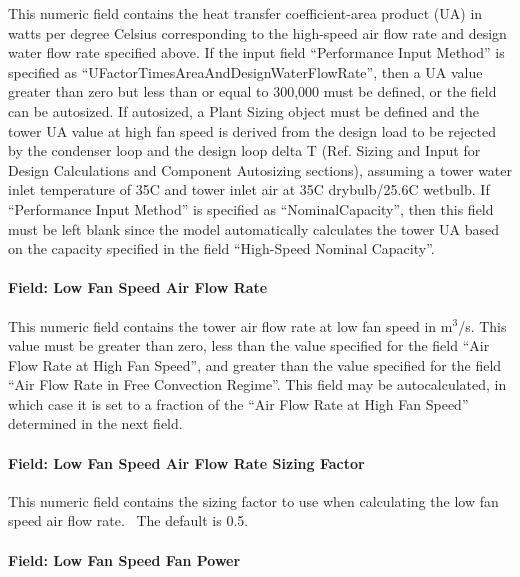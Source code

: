 This numeric field contains the heat transfer coefficient-area product (UA) in watts per degree Celsius corresponding to the high-speed air flow rate and design water flow rate specified above. If the input field ``Performance Input Method'' is specified as ``UFactorTimesAreaAndDesignWaterFlowRate'', then a UA value greater than zero but less than or equal to 300,000 must be defined, or the field can be autosized. If autosized, a Plant Sizing object must be defined and the tower UA value at high fan speed is derived from the design load to be rejected by the condenser loop and the design loop delta T (Ref. Sizing and Input for Design Calculations and Component Autosizing sections), assuming a tower water inlet temperature of 35C and tower inlet air at 35C drybulb/25.6C wetbulb. If ``Performance Input Method'' is specified as ``NominalCapacity'', then this field must be left blank since the model automatically calculates the tower UA based on the capacity specified in the field ``High-Speed Nominal Capacity''.

\paragraph{Field: Low Fan Speed Air Flow Rate}\label{field-low-fan-speed-air-flow-rate}

This numeric field contains the tower air flow rate at low fan speed in m\(^{3}\)/s. This value must be greater than zero, less than the value specified for the field ``Air Flow Rate at High Fan Speed'', and greater than the value specified for the field ``Air Flow Rate in Free Convection Regime''. This field may be autocalculated, in which case it is set to a fraction of the ``Air Flow Rate at High Fan Speed'' determined in the next field.

\paragraph{Field: Low Fan Speed Air Flow Rate Sizing Factor}\label{field-low-fan-speed-air-flow-rate-sizing-factor}

This numeric field contains the sizing factor to use when calculating the low fan speed air flow rate.~ The default is 0.5.

\paragraph{Field: Low Fan Speed Fan Power}\label{field-low-fan-speed-fan-power}

